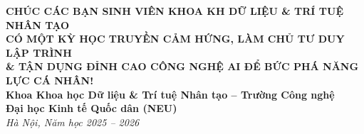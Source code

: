 \documentclass[11pt,a4paper]{article}
\begin{document}
\begin{tcolorbox}[enhanced, colback=primaryblue!5, colframe=primaryblue, arc=4pt, boxrule=1pt, top=4mm, bottom=4mm, left=5mm, right=5mm]
\begin{center}
    {\large\bfseries\color{primaryblue}CHÚC CÁC BẠN SINH VIÊN KHOA KH DỮ LIỆU \& TRÍ TUỆ NHÂN TẠO}\\[2mm]
    {\bfseries\color{secondaryteal}CÓ MỘT KỲ HỌC TRUYỀN CẢM HỨNG, LÀM CHỦ TƯ DUY LẬP TRÌNH}\\
    {\bfseries\color{secondaryteal}\& TẬN DỤNG ĐỈNH CAO CÔNG NGHỆ AI ĐỂ BỨC PHÁ NĂNG LỰC CÁ NHÂN!}\\[4mm]
    \small
    \textbf{Khoa Khoa học Dữ liệu \& Trí tuệ Nhân tạo -- Trường Công nghệ}\\
    \textbf{Đại học Kinh tế Quốc dân (NEU)}\\
    \textit{Hà Nội, Năm học 2025 -- 2026}
\end{center}
\end{tcolorbox}
\end{document}
